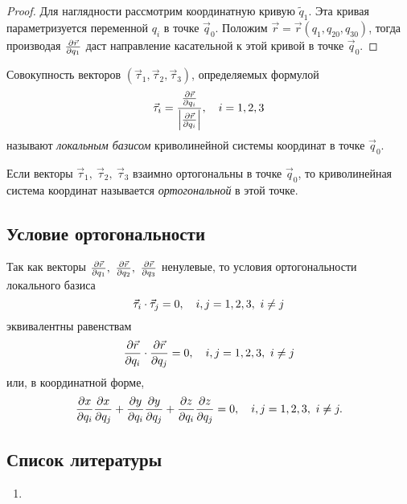 \begin{proof}
  Для наглядности рассмотрим координатную кривую $\tilde{q}_1$. Эта кривая
  параметризуется переменной $q_i$ в точке $\vec{q}_0$. Положим
  $\vec{r} = \vec{r}(q_1, q_{20}, q_{30})$, тогда производая
  $\parder[\vec{r}]{q_1}$ даст направление касательной к этой кривой в точке
  $\vec{q}_0$.
\end{proof}

\begin{definition}
  Совокупность векторов $(\vec{\tau}_1, \vec{\tau}_2, \vec{\tau}_3)$,
  определяемых формулой
  \begin{equation*}
    \vec{\tau}_i = \frac{\parder[\vec{r}]{q_i}}{\abs{\parder[\vec{r}]{q_i}}},
      \quad i = 1,2,3
  \end{equation*}
  называют \textit{локальным базисом} криволинейной системы координат в точке
  $\vec{q}_0$.
\end{definition}

\begin{definition}
  Если векторы $\vec{\tau}_1,~\vec{\tau}_2,~\vec{\tau}_3$ взаимно ортогональны
  в точке $\vec{q}_0$, то криволинейная система координат называется
  \textit{ортогональной} в этой точке.
\end{definition}

\subsection{Условие ортогональности}

Так как векторы $\parder[\vec{r}]{q_1},~\parder[\vec{r}]{q_2},
~\parder[\vec{r}]{q_3}$ ненулевые, то условия ортогональности локального базиса
\begin{equation*}
  \dotprod{\vec{\tau}_i}{\vec{\tau}_j} = 0, \quad i,j = 1,2,3,~i \neq j
\end{equation*}
эквивалентны равенствам
\begin{equation*}
  \dotprod{\parder[\vec{r}]{q_i}}{\parder[\vec{r}]{q_j}} = 0,
    \quad i,j = 1,2,3,~i \neq j
\end{equation*}
или, в координатной форме,
\begin{equation}
  \parder[x]{q_i} \parder[x]{q_j} + \parder[y]{q_i} \parder[y]{q_j} +
    \parder[z]{q_i} \parder[z]{q_j} = 0, \quad i,j = 1,2,3,~i \neq j.
\end{equation}

\subsection{Список литературы}
\begin{enumerate}
  \item \cite{lectures}
\end{enumerate}

